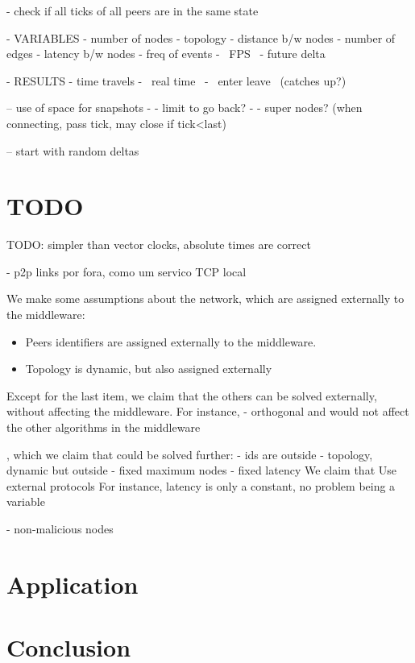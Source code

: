 \documentclass[10pt,journal,compsoc]{IEEEtran}
\begin{document}
- check if all ticks of all peers are in the same state

- VARIABLES
- number of nodes
- topology
    - distance b/w nodes
    - number of edges
- latency b/w nodes
- freq of events
- ~FPS~
- future delta

- RESULTS
- time travels
- ~real time~
- ~enter leave~ (catches up?)

-- use of space for snapshots
-    - limit to go back?
-    - super nodes? (when connecting, pass tick, may close if tick<last)

-- start with random deltas
\section{TODO}

TODO: simpler than vector clocks, absolute times are correct

- p2p links por fora, como um servico TCP local

We make some assumptions about the network, which are assigned externally to
the middleware:
%
\begin{itemize}
\item Peers identifiers are assigned externally to the middleware.
\item Topology is dynamic, but also assigned externally

\end{itemize}
%
Except for the last item, we claim that the others can be solved externally,
without affecting the middleware.
For instance,
- orthogonal and would not affect the other algorithms in the middleware

, which we claim that could be
solved further:
- ids are outside
- topology, dynamic but outside
- fixed maximum nodes
- fixed latency
We claim that Use external protocols
For instance, latency is only a constant, no problem being a variable

- non-malicious nodes

\section{Application}
\label{sec.app}

\section{Conclusion}
\label{sec.conclusion}



\end{document}

